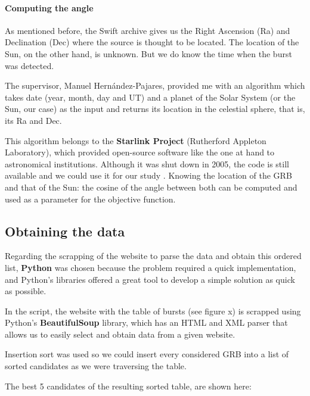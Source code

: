 \paragraph{Computing the angle}

As mentioned before, the Swift archive gives us the Right Ascension (Ra) and Declination (Dec) where the source is thought to be located. The location of the Sun, on the other hand, is unknown. But we do know the time when the burst was detected.

The supervisor, Manuel Hernández-Pajares, provided me with an algorithm which takes date (year, month, day and UT) and a planet of the Solar System (or the Sun, our case) as the input and returns its location in the celestial sphere, that is, its Ra and Dec. 

This algorithm belongs to the \textbf{Starlink Project} (Rutherford Appleton Laboratory), which provided open-source software like the one at hand to astronomical institutions. Although it was shut down in 2005, the code is still available and we could use it for our study \cite{starlinkproject}. Knowing the location of the GRB and that of the Sun: the cosine of the angle between both can be computed and used as a parameter for the objective function.

\subsection{Obtaining the data}

Regarding the scrapping of the website to parse the data and obtain this ordered list, \textbf{Python} was chosen because the problem required a quick implementation, and Python’s libraries offered a great tool to develop a simple solution as quick as possible.

In the script, the website with the table of bursts (see figure x) is scrapped using Python’s \textbf{BeautifulSoup} library, which has an HTML and XML parser that allows us to easily select and obtain data from a given website.

Insertion sort was used so we could insert every considered GRB into a list of sorted candidates as we were traversing the table. 

The best 5 candidates of the resulting sorted table, are shown here:


